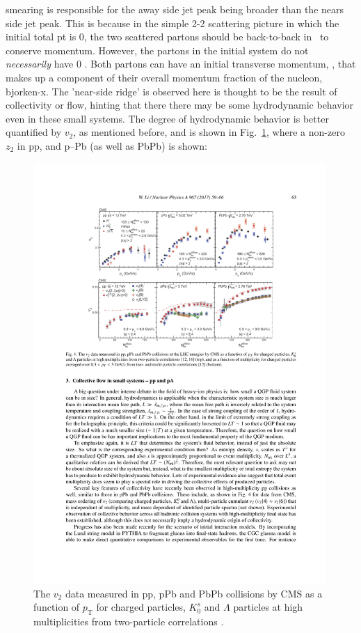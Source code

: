 \kt smearing is responsible for the away side jet peak being broader than the nears side jet peak. This is because in the simple 2-2 scattering picture in which the initial total pt is 0, the two scattered partons should be back-to-back in \deltaphi~to conserve momentum. However, the partons in the initial system  do not \textit{necessarily} have 0 \pT. Both partons can have an initial transverse momentum, \kt, that makes up a component of their overall momentum fraction of the nucleon, bjorken-x. The 'near-side ridge' is observed here is thought to be the result of collectivity or flow, hinting that there there may be some hydrodynamic behavior even in these small systems. The degree of hydrodynamic behavior is better quantified by $v_2$, as mentioned before, and is shown in Fig.~\ref{fig:small_systems_v2}, where a non-zero  $z_2$ in pp, and p--Pb (as well as PbPb) is shown:
\begin{figure}[htpb]
  \centering
  \includegraphics[width=0.99\textwidth]{Introduction/small_systems_flow.pdf}
  \caption{The $v_2$ data measured in pp, pPb and PbPb collisions by CMS as a function of $p_\mathrm{T}$ for charged particles, $K_0^s$ and $\Lambda$ particles at high multiplicities from two-particle correlations \cite{Khachatryan2017,Khachatryan2015}.}
  \label{fig:small_systems_v2}
\end{figure}

